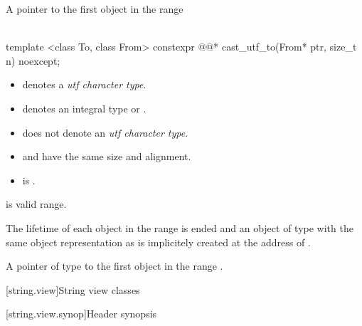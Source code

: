 \documentclass{wg21}
\begin{document}
\begin{addedblock}
\begin{itemdescr}
    \returns A pointer to the first object in the range 
    \\
\\
\end{itemdescr}
\begin{itemdecl}
template <class To, class From>
constexpr @@* cast_utf_to(From* ptr, size_t n) noexcept;
\end{itemdecl}
\begin{itemdescr}
    \constraints
    \begin{itemize}
        \item {} denotes a \emph{utf character type}.
        \item {} denotes an integral type or .
        \item {} does not denote an \emph{utf character type}.
        \item {} and  have the same size and alignment.
        \item {} is .
    \end{itemize}

    \preconditions {} is valid range.

    \effects The lifetime of each object  in the range  is ended and an object of type
     with the same object representation as  is implicitely created at the address of .

    \returns A pointer of type to the first object in the range .
\end{itemdescr}
\end{addedblock}

[string.view]{String view classes}

[string.view.synop]{Header  synopsis}
\end{document}
